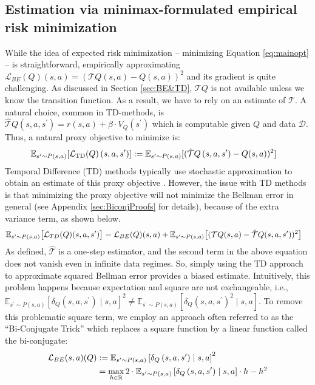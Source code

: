 \subsection{Estimation via minimax-formulated empirical risk minimization}
\label{sec:DoubleSampling}
While the idea of expected risk minimization -- minimizing Equation \eqref{eq:mainopt} -- is straightforward, empirically approximating $\mathcal{L}_{B E}(Q)(s, a) = (\mathcal{T} Q(s, a)-Q(s, a))^2$ and its gradient is quite challenging. 
As discussed in Section \ref{sec:BE&TD}, $\mathcal{T}Q$ is not available unless we know the transition function. As a result, we have to rely on an estimate of $\mathcal{T}$. A natural choice, common in TD-methods, is $\hat{\mathcal{T}} Q\left(s, a, s^{\prime}\right)=r(s, a)+\beta \cdot V_Q(s^\prime)$ which is computable given $Q$ and data $\mathcal{D}$. Thus, a natural proxy objective to minimize is:
\begin{align}
    &\mathbb{E}_{s' \sim P(s, a)} [\mathcal{L}_{\mathrm{TD}}(Q)\left(s, a, s^{\prime}\right)] :=\mathbb{E}_{s' \sim P(s, a)} [(\hat{\mathcal{T}} Q\left(s, a, s^{\prime}\right)-Q(s, a))^2] \notag
\end{align}
Temporal Difference (TD) methods typically use stochastic approximation to obtain an estimate of this proxy objective \citep{tesauro1995temporal, adusumilli2019temporal}. However, the issue with TD methods is that minimizing the proxy objective will not minimize the Bellman error in general (see Appendix \ref{sec:BiconjProofs} for details), because of the extra variance term, as shown below. 
\begin{align}
&\mathbb{E}_{s' \sim P(s, a)} 
\bigl[\mathcal{L}_{TD}(Q)(s, a, s^\prime)\bigr] = \mathcal{L}_{BE}(Q)(s, a) + \mathbb{E}_{s' \sim P(s, a)} 
\bigl[(\mathcal{T}Q(s, a) - \hat{\mathcal{T}}Q(s, a, s^\prime))^2\bigr]    \notag
\end{align}
As defined, $\hat{\mathcal{T}}$ is a one-step estimator, and the second term in the above equation does not vanish even in infinite data regimes. So, simply using the TD approach to approximate squared Bellman error provides a biased estimate. Intuitively, this problem happens because expectation and square are not exchangeable, i.e., 
$
\mathbb{E}_{ s^\prime \sim P(s, a)}\left[\delta_{Q}\left(s,a, s^\prime\right)\mid s, a\right]^2 \neq \mathbb{E}_{ s^\prime \sim P(s, a)}\left[\delta_{Q}\left(s,a, s^\prime\right)^2\mid s, a\right]
$. To remove this problematic square term, we employ an approach often referred to as the ``Bi-Conjugate Trick'' which replaces a square function by a linear function called the bi-conjugate:
\begin{align}
     \mathcal{L}_{BE}(s,a)(Q)&:=\mathbb{E}_{ s^\prime \sim P(s, a)}\left[\delta_{Q}\left(s,a, s^\prime\right)\mid s, a\right]^2\notag
     \\
     &=\max_{h\in \mathbb{R}}2\cdot\mathbb{E}_{ s^\prime \sim P(s, a)}\left[\delta_{Q}\left(s,a, s^\prime\right)\mid s, a\right]\cdot h-h^2 \notag
\end{align}

